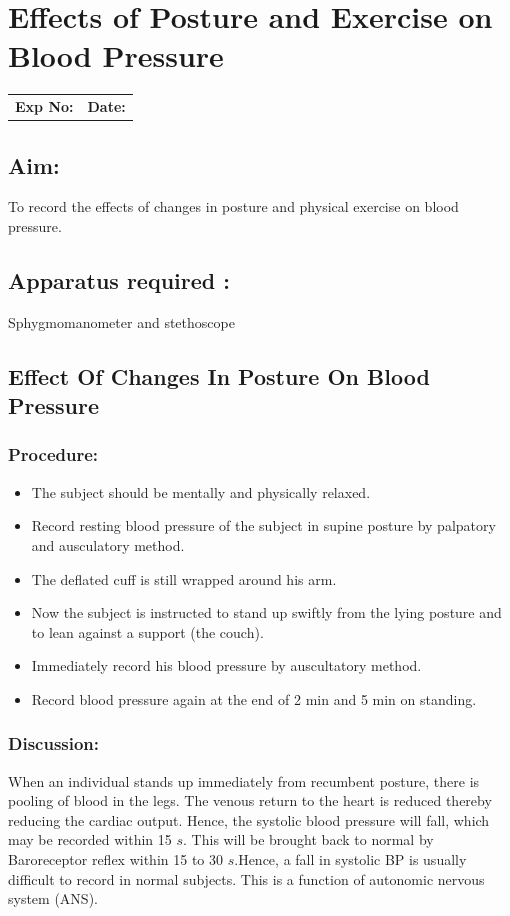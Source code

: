 \documentclass[a4paper,12pt,openany,twoside]{book}
\begin{document}
															\chapter*{\centering Effects of Posture and Exercise on	Blood Pressure}
															\begin{tabular}{p{5in} p{1in}}
																\textbf{Exp No:}  & \textbf{Date:}\\
															\end{tabular}
\section*{Aim:}
	To record the effects of changes in posture and physical exercise on blood pressure.
	\section*{Apparatus required :}
	Sphygmomanometer and stethoscope
	\section*{Effect Of Changes In Posture On Blood Pressure}
	\subsection*{Procedure:}
	\begin{itemize}
\item{The subject should be mentally and physically relaxed.}
\item{Record resting blood pressure of the subject in supine posture by palpatory and ausculatory method.}
\item{The deflated cuff is still wrapped around his arm.}
\item{Now the subject is instructed to stand up swiftly from the lying posture and to lean against a support (the couch).}
\item{Immediately record his blood pressure by auscultatory method.}
\item{Record blood pressure again at the end of 2 min and 5 min on standing.}
	\end{itemize}
	\subsection*{Discussion:}
		When an individual stands up immediately from recumbent posture, there is pooling of blood in the legs.
		The venous return to the heart is reduced thereby reducing the cardiac output. Hence, the systolic blood pressure will fall, which may be recorded within 15 $s$. This will be brought back to normal by Baroreceptor reflex within 15 to 30 $s$.Hence, a fall in systolic BP is usually difficult to record in normal subjects.
		This is a function of autonomic nervous system (ANS).
\end{document}
